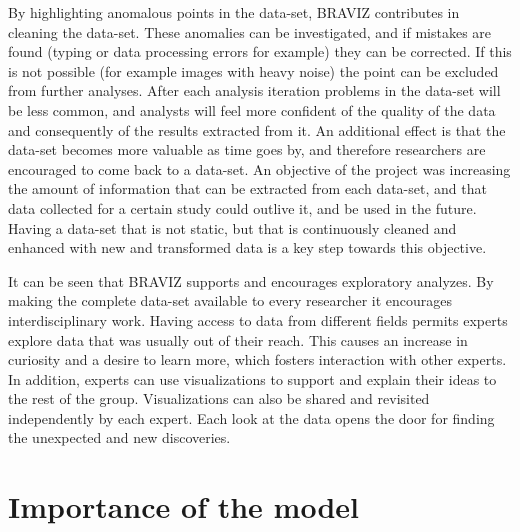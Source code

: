 {%
By highlighting anomalous points in the data-set, BRAVIZ contributes in cleaning the data-set. These anomalies can be investigated, and if mistakes are found (typing or data processing errors for example) they can be corrected. If this is not possible (for example images with heavy noise) the point can be excluded from further analyses. After each analysis iteration problems in the data-set will be less common, and analysts will feel more confident of the quality of the data and consequently of the results extracted from it. An additional effect is that the data-set becomes more valuable as time goes by, and therefore researchers are encouraged to come back to a data-set. An objective of the project was increasing the amount of information that can be extracted from each data-set, and that data collected for a certain study could outlive it, and be used in the future. Having a data-set that is not static, but that is continuously cleaned and enhanced with new and transformed data is a key step towards this objective.

It can be seen that BRAVIZ supports and encourages exploratory analyzes. By making the complete data-set available to every researcher it encourages interdisciplinary work. Having access to data from different fields permits experts explore data that was usually out of their reach. This causes an increase in curiosity and a desire to learn more, which fosters interaction with other experts. In addition, experts can use visualizations to support and explain their ideas to the rest of the group. Visualizations can also be shared and revisited independently by each expert. Each look at the data opens the door for finding the unexpected and new discoveries. 


\section{Importance of the model}


}
